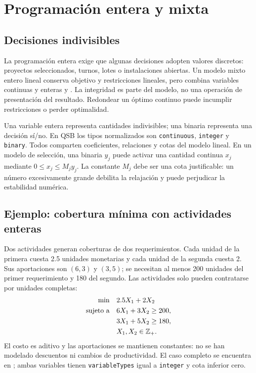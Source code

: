 \chapter{Programación entera y mixta}
\label{chap:entera}

\section{Decisiones indivisibles}
La programación entera exige que algunas decisiones adopten valores discretos:
proyectos seleccionados, turnos, lotes o instalaciones abiertas. Un modelo
mixto entero lineal conserva objetivo y restricciones lineales, pero combina
variables continuas y enteras \cite{nemhauser1988integer} y \cite{wolsey1998integer}.
La integridad es parte del modelo, no una operación de presentación del
resultado. Redondear un óptimo continuo puede incumplir restricciones o perder
optimalidad.

Una variable entera representa cantidades indivisibles; una binaria representa
una decisión sí/no. En QSB los tipos normalizados son \texttt{continuous},
\texttt{integer} y \texttt{binary}. Todos comparten coeficientes, relaciones y
cotas del modelo lineal. En un modelo de selección, una binaria \(y_j\) puede
activar una cantidad continua \(x_j\) mediante \(0\leq x_j\leq M_jy_j\).
La constante \(M_j\) debe ser una cota justificable: un número excesivamente
grande debilita la relajación y puede perjudicar la estabilidad numérica.

\section{Ejemplo: cobertura mínima con actividades enteras}
Dos actividades generan coberturas de dos requerimientos. Cada unidad de la
primera cuesta 2.5 unidades monetarias y cada unidad de la segunda cuesta 2.
Sus aportaciones son \((6,3)\) y \((3,5)\); se necesitan al menos 200 unidades
del primer requerimiento y 180 del segundo. Las actividades solo pueden
contratarse por unidades completas:
\[
\begin{aligned}
 \min\quad &2.5X_1+2X_2\\
 \text{sujeto a}\quad &6X_1+3X_2\geq200,\\
 &3X_1+5X_2\geq180,\\
 &X_1,X_2\in\mathbb{Z}_+.
\end{aligned}
\]
El costo es aditivo y las aportaciones se mantienen constantes: no se han
modelado descuentos ni cambios de productividad. El caso completo se
encuentra en ; ambas variables tienen
\texttt{variableTypes} igual a \texttt{integer} y cota inferior cero.

